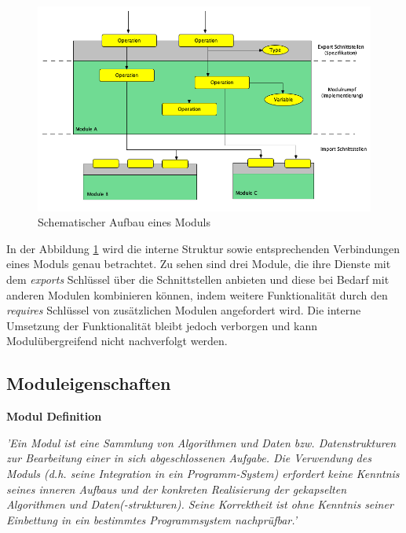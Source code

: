       \begin{figure}[h!]
        \centering
        \includegraphics[width=\textwidth]{material/images/module-workflow.png}
        \caption{Schematischer Aufbau eines Moduls}
        \label{fig:module-workflow}
      \end{figure} 

    In der Abbildung \ref{fig:module-workflow} wird die interne Struktur sowie entsprechenden Verbindungen eines Moduls genau betrachtet. Zu sehen sind drei Module, die ihre Dienste mit dem \textit{exports} Schlüssel über die Schnittstellen anbieten und diese bei Bedarf mit anderen Modulen kombinieren können, indem weitere Funktionalität durch den \textit{requires} Schlüssel von zusätzlichen Modulen angefordert wird. Die interne Umsetzung der Funktionalität bleibt jedoch verborgen und kann Modulübergreifend nicht nachverfolgt werden. 

  \subsection{Moduleigenschaften}

\textbf{Modul Definition}
\begin{displayquote}
	\textit {'Ein Modul ist eine Sammlung von Algorithmen und Daten bzw. Datenstrukturen zur Bearbeitung einer in sich abgeschlossenen Aufgabe. Die Verwendung des Moduls (d.h. seine Integration in ein Programm-System) erfordert keine Kenntnis seines inneren Aufbaus und der konkreten Realisierung der gekapselten Algorithmen und Daten(-strukturen). Seine Korrektheit ist ohne Kenntnis seiner Einbettung in ein bestimmtes Programmsystem nachprüfbar.'} \cite{rechenberg2006informatik}
\end{displayquote}\bigbreak 

